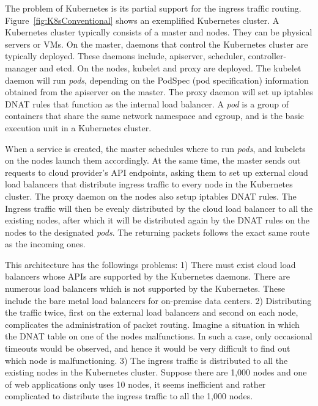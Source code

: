 \begin{figure}[tb]
\end{figure}

The problem of Kubernetes is its partial support for the ingress traffic routing.
Figure~\ref{fig:K8sConventional} shows an exemplified Kubernetes cluster.
A Kubernetes cluster typically consists of a master and nodes. They can be physical servers or VMs.
On the master, daemons that control the Kubernetes cluster are typically deployed. 
These daemons include, apiserver, scheduler, controller-manager and etcd. 
On the nodes, kubelet and proxy are deployed.
The kubelet daemon will run {\it pods}, depending on the PodSpec (pod specification) information obtained from the apiserver on the master.
The proxy daemon will set up iptables DNAT rules that function as the internal load balancer.
A {\em pod} is a group of containers that share the same network namespace and cgroup,
and is the basic execution unit in a Kubernetes cluster.

When a service is created, the master schedules where to run {\em pods}, and kubelets on the nodes launch them accordingly.
At the same time, the master sends out requests to cloud provider's API endpoints, asking them to set up external cloud load balancers that distribute ingress traffic to every node in the Kubernetes cluster.
The proxy daemon on the nodes also setup iptables DNAT\cite{MartinA.Brown2017} rules. 
The Ingress traffic will then be evenly distributed by the cloud load balancer to all the existing nodes, 
after which it will be distributed again by the DNAT rules on the nodes to the designated {\em pods}. 
The returning packets follows the exact same route as the incoming ones.

This architecture has the followings problems: 
1) There must exist cloud load balancers whose APIs are supported by the Kubernetes daemons.
There are numerous load balancers which is not supported by the Kubernetes.
These include the bare metal load balancers for on-premise data centers.
2) Distributing the traffic twice, first on the external load balancers and second on each node, complicates the administration of packet routing. 
Imagine a situation in which the DNAT table on one of the nodes malfunctions.
In such a case, only occasional timeouts would be observed, and hence it would be very difficult to find out which node is malfunctioning.   
3) The ingress traffic is distributed to all the existing nodes in the Kubernetes cluster. 
Suppose there are 1,000 nodes and one of web applications only uses 10 nodes, it seems inefficient and rather complicated to distribute the ingress traffic to all the 1,000 nodes.

